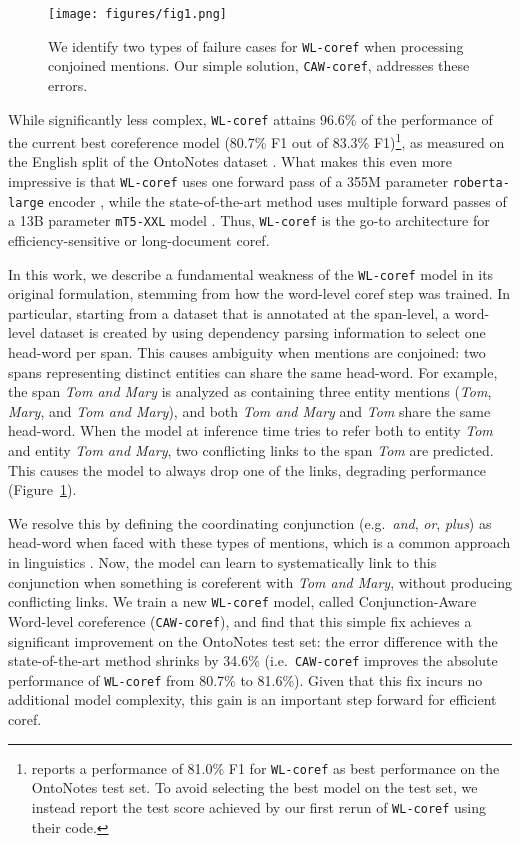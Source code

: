 \documentclass[11pt]{article}
\newcommand\wlcoref{{\texttt{WL-coref}}}
\newcommand\cawcoref{{\texttt{CAW-coref}}}
\begin{document}
\begin{figure}
    \centering
    \texttt{[image: figures/fig1.png]}
    \caption{We identify two types of  failure cases for \wlcoref{} when processing conjoined mentions. Our simple solution, \cawcoref{}, addresses these errors. }
    \label{fig:fig1}
\end{figure} 
While significantly less complex, \wlcoref{} attains 96.6\% of the performance of the current best coreference model (80.7\% F1 out of 83.3\% F1)\footnote{\citet{dobrovolskii-2021-word} reports a performance of 81.0\% F1 for \wlcoref{} as best performance on the OntoNotes test set. To avoid selecting the best model on the test set, we instead report the test score achieved by our first rerun of \wlcoref{} using their code.}, as measured on the English split of the OntoNotes dataset \citep{pradhan-etal-2012-conll}. What makes this even more impressive is that \wlcoref{} uses one forward pass of a 355M parameter \texttt{roberta-large} encoder \citep{liu2019roberta}, while the state-of-the-art method \citep{bohnet2023coreference} uses multiple forward passes of a 13B parameter \texttt{mT5-XXL} model \citep{xue-etal-2021-mt5}. Thus, \wlcoref{} is the go-to architecture for efficiency-sensitive or long-document coref.


In this work, we describe a fundamental weakness of the \wlcoref{} model in its original formulation, stemming from how the word-level coref step was trained. In particular, starting from a dataset that is annotated at the span-level, a word-level dataset is created by using dependency parsing information to select one head-word per span. This causes ambiguity when mentions are conjoined: two spans representing distinct entities can share the same head-word. For example, the span \emph{Tom and Mary}
is analyzed as containing three entity mentions (\emph{Tom}, \emph{Mary}, and \emph{Tom and Mary}), and both \emph{Tom and Mary} and \emph{Tom} share the same head-word. When the model at inference time tries to refer both to entity \emph{Tom} and entity \emph{Tom and Mary}, two conflicting links to the span \emph{Tom} are predicted. This causes the model to always drop one of the links, degrading performance (Figure~\ref{fig:fig1}).

We resolve this by defining the coordinating conjunction (e.g.~\emph{and}, \emph{or}, \emph{plus}) as head-word when faced with these types of mentions, which is a common approach in linguistics \citep{zoerner1995coordination, progovac1998structure}. Now, the model can learn to systematically link to this conjunction when something is coreferent with \emph{Tom and Mary}, without producing conflicting links. We train a new \wlcoref{} model, called Conjunction-Aware Word-level coreference (\cawcoref{}), and find that this simple fix achieves a significant improvement on the OntoNotes test set: the error difference with the state-of-the-art method shrinks by 34.6\% (i.e.~\cawcoref{} improves the absolute performance of \wlcoref{} from 80.7\% to 81.6\%). Given that this fix incurs no additional model complexity, this gain is an important step forward for efficient coref.
\end{document}
